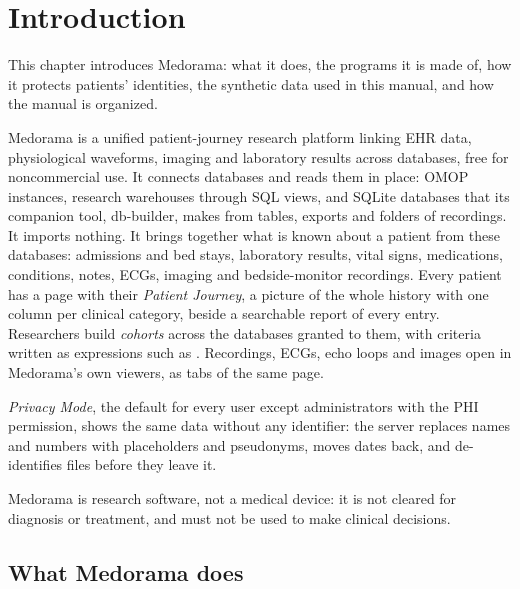 \chapter{Introduction}
\label{chap:introduction}

This chapter introduces Medorama: what it does, the programs it is made of, how it protects
patients' identities, the synthetic data used in this manual, and how the manual is organized.

Medorama is a unified patient-journey research platform linking EHR data, physiological
waveforms, imaging and laboratory results across databases, free for noncommercial use. It
connects databases and reads them in place: OMOP instances, research warehouses through SQL
views, and SQLite databases that its companion tool, db-builder, makes from tables, exports and
folders of recordings. It imports nothing. It brings together what is known about a patient
from these databases: admissions and bed stays, laboratory results, vital
signs, medications, conditions, notes, ECGs, imaging and bedside-monitor recordings. Every
patient has a page with their \emph{Patient Journey}, a picture of the whole history with one
column per clinical category, beside a searchable report of every entry. Researchers build
\emph{cohorts} across the databases granted to them, with criteria written as expressions such as
. Recordings, ECGs, echo loops and images open in Medorama's own
viewers, as tabs of the same page.

\emph{Privacy Mode}, the default for every user except administrators with the PHI permission,
shows the same data without any identifier: the server replaces names and numbers with
placeholders and pseudonyms, moves dates back, and de-identifies files before they leave it.


\begin{note}
Medorama is research software, not a medical device: it is not cleared for diagnosis or
treatment, and must not be used to make clinical decisions.
\end{note}

\section{What Medorama does}
\label{sec:introduction-what}

